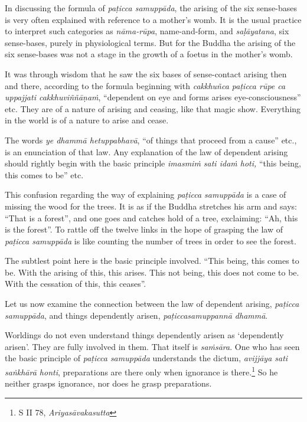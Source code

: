 In discussing the formula of \emph{paṭicca samuppāda}, the arising of the six sense-bases is very often explained with reference to a mother's womb. It is the usual practice to interpret such categories as \emph{nāma-rūpa}, name-and-form, and \emph{saḷāyatana}, six sense-bases, purely in physiological terms. But for the Buddha the arising of the six sense-bases was not a stage in the growth of a foetus in the mother's womb.

It was through wisdom that he saw the six bases of sense-contact arising then and there, according to the formula beginning with \emph{cakkhuñca paṭicca rūpe ca uppajjati cakkhuviññāṇaṁ}, ``dependent on eye and forms arises eye-consciousness'' etc. They are of a nature of arising and ceasing, like that magic show. Everything in the world is of a nature to arise and cease.

The words \emph{ye dhammā hetuppabhavā}, ``of things that proceed from a cause'' etc., is an enunciation of that law. Any explanation of the law of dependent arising should rightly begin with the basic principle \emph{imasmiṁ sati idaṁ hoti,} ``this being, this comes to be'' etc.

This confusion regarding the way of explaining \emph{paṭicca samuppāda} is a case of missing the wood for the trees. It is as if the Buddha stretches his arm and says: ``That is a forest'', and one goes and catches hold of a tree, exclaiming: ``Ah, this is the forest''. To rattle off the twelve links in the hope of grasping the law of \emph{paṭicca samuppāda} is like counting the number of trees in order to see the forest.

The subtlest point here is the basic principle involved. ``This being, this comes to be. With the arising of this, this arises. This not being, this does not come to be. With the cessation of this, this ceases''.

Let us now examine the connection between the law of dependent arising, \emph{paṭicca samuppāda}, and things dependently arisen, \emph{paṭiccasamuppannā dhammā}.

Worldings do not even understand things dependently arisen as `dependently arisen'. They are fully involved in them. That itself is \emph{saṁsāra}. One who has seen the basic principle of \emph{paṭicca samuppāda} understands the dictum, \emph{avijjāya sati saṅkhārā honti}, preparations are there only when ignorance is there.\footnote{S II 78, \emph{Ariyasāvakasutta}} So he neither grasps ignorance, nor does he grasp preparations.

